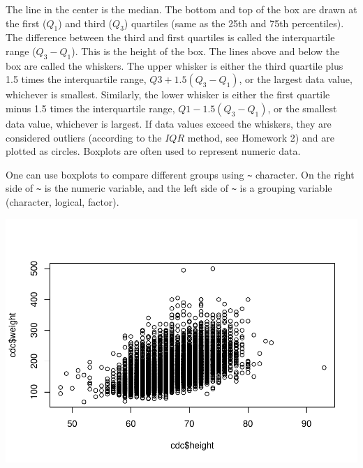 \documentclass[
]{book}
\newenvironment{Shaded}{\begin{snugshade}}{\end{snugshade}}
\newcommand{\DecValTok}[1]{\textcolor[rgb]{0.00,0.00,0.81}{#1}}
\newcommand{\KeywordTok}[1]{\textcolor[rgb]{0.13,0.29,0.53}{\textbf{#1}}}
\newcommand{\NormalTok}[1]{#1}
\newcommand{\OperatorTok}[1]{\textcolor[rgb]{0.81,0.36,0.00}{\textbf{#1}}}
\newcommand{\StringTok}[1]{\textcolor[rgb]{0.31,0.60,0.02}{#1}}
\begin{document}
The line in the center is the median. The bottom and top of the box are drawn at the first (\(Q_1\)) and third (\(Q_3\)) quartiles (same as the 25th and 75th percentiles). The difference between the third and first quartiles is called the interquartile range (\(Q_3-Q_1\)). This is the height of the box. The lines above and below the box are called the whiskers. The upper whisker is either the third quartile plus 1.5 times the interquartile range, \(Q3 +1.5(Q_3-Q_1)\), or the largest data value, whichever is smallest. Similarly, the lower whisker is either the first quartile minus 1.5 times the interquartile range, \(Q1-1.5(Q_3-Q_1)\), or the smallest data value, whichever is largest. If data values exceed the whiskers, they are considered outliers (according to the \(IQR\) method, see Homework 2) and are plotted as circles. Boxplots are often used to represent numeric data.

One can use boxplots to compare different groups using \texttt{\textasciitilde{}} character. On the right side of \texttt{\textasciitilde{}} is the numeric variable, and the left side of \texttt{\textasciitilde{}} is a grouping variable (character, logical, factor).

\begin{Shaded}
\end{Shaded}

\includegraphics{_main_files/figure-latex/unnamed-chunk-176-1.pdf}
\end{document}
